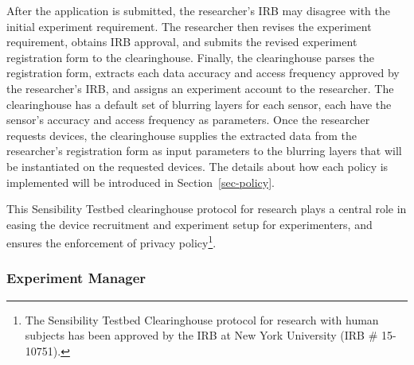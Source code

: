 After the application is submitted, the researcher's IRB may disagree with 
the initial experiment requirement. %
The researcher then revises the experiment requirement, obtains IRB approval, and
submits the revised experiment registration form to the clearinghouse. Finally, the clearinghouse
parses the registration form, extracts each data accuracy and access 
frequency approved by the researcher's IRB, and assigns an experiment 
account to the researcher. The clearinghouse
has a default set of blurring layers for each sensor, each have the 
sensor's accuracy and access frequency as parameters. Once the researcher requests 
devices, the clearinghouse supplies the extracted data from the 
researcher's registration form as input parameters to
the blurring layers that will be instantiated on the requested devices. The details about
how each policy is implemented will be introduced in Section~\ref{sec-policy}.

This Sensibility Testbed
clearinghouse protocol for research plays a central role in
easing the device recruitment and experiment setup for experimenters, 
and ensures the enforcement
of privacy policy\footnote{\scriptsize The Sensibility Testbed Clearinghouse
protocol for research with human subjects has been approved by
the IRB at New York University (IRB \# 15-10751).}. 

\subsubsection{Experiment Manager}\label{sec-emt}

